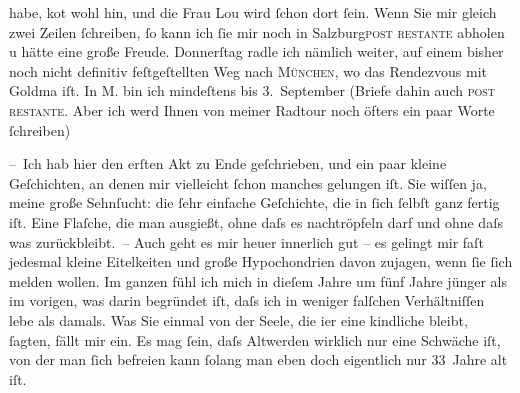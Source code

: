                habe, ko{\geminationm}t wohl hin, und die Frau Lou wird ſchon dort ſein. Wenn Sie mir gleich zwei Zeilen
               ſchreiben, ſo kann ich ſie mir noch in Salzburg\textsc{post restante} abholen u hätte eine große Freude.
                  Donnerſtag radle ich nämlich weiter, auf einem bisher noch nicht
               definitiv feſtgeſtellten Weg nach \textsc{München}, wo das Rendezvous mit Goldma{\geminationn} iſt. In M. bin ich mindeſtens bis
                  3. September (Briefe dahin auch \textsc{post
                  restante}. Aber ich {\pb}werd Ihnen von meiner Radtour
               noch öfters ein paar Worte ſchreiben)\pend
           
\pstart
           – Ich hab hier den erſten Akt
               zu Ende geſchrieben, und ein paar kleine Geſchichten, an denen mir vielleicht ſchon manches gelungen
               iſt. Sie wiſſen ja, meine große Sehnſucht: die ſehr einfache Geſchichte, die in ſich
               ſelbſt ganz fertig iſt. Eine Flaſche, die man ausgießt, ohne daſs es nachtröpfeln
               darf und ohne daſs was zurückbleibt. – Auch geht es mir heuer innerlich gut – es
               gelingt mir faſt jedesmal kleine Eitelkeiten und große {\pb}Hypochondrien davon zujagen, wenn ſie ſich melden wollen. Im ganzen fühl ich mich
               in dieſem Jahre um fünf Jahre jünger als im vorigen, was darin begründet iſt, daſs
               ich in weniger falſchen Verhältniſſen lebe als damals. Was Sie einmal von der Seele,
               die i{\geminationm}er eine kindliche bleibt, ſagten, fällt mir ein.
               Es mag ſein, daſs Altwerden wirklich nur eine Schwäche iſt, von der man ſich befreien
                  kann{\dotsfour}{ }ſolang man eben doch eigentlich nur 33 Jahre alt
               iſt.\pend
           

